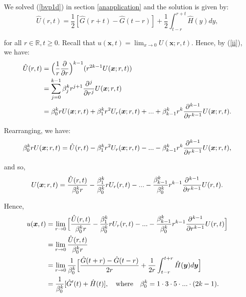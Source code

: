 \documentclass[a4paper, 12pt]{article}
\numberwithin{equation}{section}
\begin{document}
We solved (\ref{bvp1d}) in section \ref{anapplication} and the solution is given
by: 
\begin{equation}\label{nomorelabels}
    \hat{U}(r,t)=\frac{1}{2}[\hat{G}(r+t)-\hat{G}(t-r)]+\frac{1}{2}\int_{t-r}^{r+t}\hat{H}(y)dy,
\end{equation}

for all $r\in\mathbb{R}, t \ge 0$. Recall that $u(\boldsymbol{x},t)=\lim_{x
\rightarrow 0} U(\boldsymbol{x}; r, t)$. Hence, by (\ref{ii}), we have:
\begin{equation*}
    \begin{aligned}
        \hat{U}(r,t)&=\Big(\frac{1}{r} \diffp[1]{}{r}\Big)^{k-1}(r^{2k-1}U(\boldsymbol{x};r,t))\\
        &=\sum_{j=0}^{k-1}\beta_j^k r^{j+1} \diffp[j]{}{r}U(\boldsymbol{x};r,t)\\ 
        &=\beta_0^k rU(\boldsymbol{x};r,t)+\beta_1^k r^2U_r(\boldsymbol{x};r,t)+...+\beta_{k-1}^k r^k\diffp[k-1]{}{r}U(\boldsymbol{x};r,t).
    \end{aligned}
\end{equation*}

Rearranging, we have:
\begin{equation*}
    \beta_0^k rU(\boldsymbol{x};r,t) = \hat{U}(r,t) - \beta_1^k r^2U_r(\boldsymbol{x};r,t) - ... -\beta_{k-1}^k r^k\diffp[k-1]{}{r}U(\boldsymbol{x};r,t),
\end{equation*}

and so,
\begin{equation*}
    U(\boldsymbol{x};r,t) = \frac{\hat{U}(r,t)}{\beta_0^k r} - \frac{\beta_1^k}{\beta_0^k} rU_r(r,t) - ... - \frac{\beta_{k-1}^k}{\beta_0^k} r^{k-1} \diffp[k-1]{}{r}U(r,t).
\end{equation*}

Hence,
\begin{equation*}
    \begin{aligned}
        u(\boldsymbol{x}, t)&=\lim_{r \rightarrow 0}\Big[\frac{\hat{U}(r,t)}{\beta_0^k r} - \frac{\beta_1^k}{\beta_0^k} rU_r(r,t) - ... - \frac{\beta_{k-1}^k}{\beta_0^k} r^{k-1} \diffp[k-1]{}{r}U(r,t)\Big]\\ 
        &=\lim_{r \rightarrow 0}\frac{\hat{U}(r,t)}{\beta_0^k r}\\ 
        &=\lim_{r \rightarrow 0} \frac{1}{\beta_0^k} \Big[\frac{\hat{G}(t+r)-\hat{G}(t-r)}{2r} + \frac{1}{2r}\int_{t-r}^{t+r} \hat{H}(\boldsymbol{y})d\boldsymbol{y}\Big]\\
        &= \frac{1}{\beta_0^k}[\hat{G}'(t)+\hat{H}(t)], \quad \textrm{where} \quad \beta_0^k = 1 \cdot 3 \cdot 5 \cdot ... \cdot (2k-1).
    \end{aligned}
\end{equation*}
\end{document}
